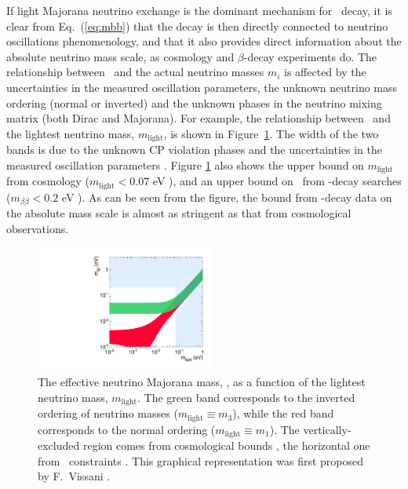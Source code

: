 \documentclass{PoS}
\begin{document}
If light Majorana neutrino exchange is the dominant mechanism for \bbonu\ decay, it is clear from Eq.~(\ref{eq:mbb}) that the decay is then directly connected to neutrino oscillations phenomenology, and that it also provides direct information about the absolute neutrino mass scale, as cosmology \cite{Lesgourgues:2012uu} and $\beta$-decay experiments \cite{Drexlin:2013lha} do. The relationship between \mbb\ and the actual neutrino masses $m_i$ is affected by the uncertainties in the measured oscillation parameters, the unknown neutrino mass ordering (normal or inverted) and the unknown phases in the neutrino mixing matrix (both Dirac and Majorana). For example, the relationship between \mbb\ and the lightest neutrino mass, $m_\mathrm{light}$, is shown in Figure~\ref{fig:BetaBetaVsLight}. The width of the two bands is due to the unknown CP violation phases and the uncertainties in the measured oscillation parameters \cite{Gonzalez-Garcia:2014bfa}. Figure \ref{fig:BetaBetaVsLight} also shows the upper bound on $m_\mathrm{light}$ from cosmology ($m_\mathrm{light}<0.07$ eV \cite{Ade:2013zuv}), and an upper bound on \mbb\ from \bbonu-decay searches ($m_{\beta\beta}<0.2$ eV \cite{Albert:2014awa, Asakura:2014lma}). As can be seen from the figure, the bound from \bbonu-decay data on the absolute mass scale is almost as stringent as that from cosmological observations.

\begin{figure}
\centering
\includegraphics[width=0.525\textwidth]{img/BetaBetaVsLight.pdf}
\caption{The effective neutrino Majorana mass, \mbb, as a function of the lightest neutrino mass, $m_\mathrm{light}$. The green band corresponds to the inverted ordering of neutrino masses ($m_\mathrm{light}\equiv m_{3}$), while the red band corresponds to the normal ordering ($m_\mathrm{light}\equiv m_{1}$). The vertically-excluded region comes from cosmological bounds \cite{Ade:2013zuv}, the horizontal one from \bbonu\ constraints \cite{Albert:2014awa, Asakura:2014lma}. This graphical representation was first proposed by F.~Vissani \cite{Vissani:1999tu}.} \label{fig:BetaBetaVsLight}
\end{figure}
\end{document}
